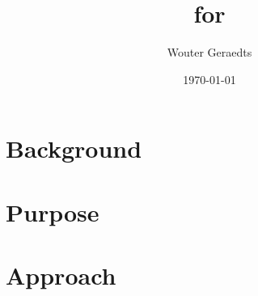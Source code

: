 \documentclass[a4paper,oneside]{article}
\title{\Premiseselection for \coq}
\author{Wouter Geraedts}
\date{\today}
\begin{document}
	\maketitle
	
	\section{Background}
	
	
	\section{Purpose}
	
	
	\section{Approach}
	
	
	
    
    
\end{document}
